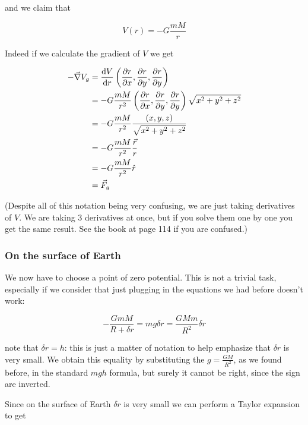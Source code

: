 \documentclass[10pt]{extarticle}
\begin{document}
and we claim that

$$
    V(r) = - G \frac{m M}{r}
$$

Indeed if we calculate the gradient of $V$ we get

\begin{align*}
    - \vec \nabla V_g & = \dv{V}{r} \left(\pdv{r}{x},\pdv{r}{y},\pdv{r}{y} \right)                                  \\
                      & = - G \frac{m M}{r^2} \left(\pdv{r}{x},\pdv{r}{y},\pdv{r}{y} \right) \sqrt{x^2 + y^2 + z^2} \\
                      & = - G \frac{m M}{r^2} \frac{(x, y, z)}{\sqrt{x^2 + y^2 + z^2}}                              \\
                      & = - G \frac{m M}{r^2} \frac{\vec r}{r}                                                      \\
                      & = - G \frac{m M}{r^2} \hat r                                                                \\
                      & = \vec F_g
\end{align*}

(Despite all of this notation being very confusing, we are just taking derivatives of $V$. We are taking 3 derivatives at once, but if you solve them one by one you get the same result. See the book at page 114 if you are confused.)

\subsubsection{On the surface of Earth}

We now have to choose a point of zero potential. This is not a trivial task, especially if we consider that just plugging in the equations we had before doesn't work:

$$
    - \frac{G m M}{R + \delta r} = m g \delta r = \frac{G M m}{R^2} \delta r
$$

note that $\delta r = h$: this is just a matter of notation to help emphasize that $\delta r$ is very small.
We obtain this equality by substituting the $g = \frac{GM}{R^2}$, as we found before, in the standard $mgh$ formula, but surely it cannot be right, since the sign are inverted.

Since on the surface of Earth $\delta r$ is very small we can perform a Taylor expansion to get
\end{document}
